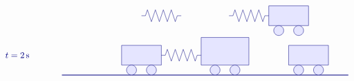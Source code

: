 \begin{solution}
\begin{itemize}
\begin{equation*}
\begin{tikzpicture}[scale=0.8, color=blue!50!black]
\begin{scope}[yshift=-2cm]
\begin{scope}[xshift=8.4cm]
            \draw[fill=blue!10] (2,0.5) rectangle (4,1.5);
            \draw[fill=blue!10] (2.5,0.25) circle (0.25);
            \draw[fill=blue!10] (3.5,0.25) circle (0.25);
          \end{scope}
          \begin{scope}[xshift=4cm]
            \draw (0,1) -- ++(0.2,0) -- ++(0.1,0.3)
            -- ++(0.2,-0.6) -- ++(0.2,0.6)
            -- ++(0.2,-0.6) -- ++(0.2,0.6)
            -- ++(0.2,-0.6) -- ++(0.2,0.6)
            -- ++(0.2,-0.6) -- ++(0.1,0.3)
            -- ++(0.2,0);
          \end{scope}
          \begin{scope}[xshift=8.4cm]
            \draw (0,1) -- ++(0.2,0) -- ++(0.1,0.3)
            -- ++(0.2,-0.6) -- ++(0.2,0.6)
            -- ++(0.2,-0.6) -- ++(0.2,0.6)
            -- ++(0.2,-0.6) -- ++(0.2,0.6)
            -- ++(0.2,-0.6) -- ++(0.1,0.3)
            -- ++(0.2,0);
          \end{scope}
        \end{scope}
        \begin{scope}[yshift=-4cm]
          \draw (-3,1) node[right] {$t=2\s$};
          \draw[thick] (0,0) -- (14.4,0);
          \begin{scope}[xshift=1cm]
            \draw[fill=blue!10] (2,0.5) rectangle (4,1.5);
            \draw[fill=blue!10] (2.5,0.25) circle (0.25);
            \draw[fill=blue!10] (3.5,0.25) circle (0.25);
          \end{scope}
          \begin{scope}[xshift=5.2cm]
            \draw[fill=blue!10] (1.8,0.5) rectangle (4.2,1.9);
            \draw[fill=blue!10] (2.5,0.25) circle (0.25);
            \draw[fill=blue!10] (3.5,0.25) circle (0.25);
          \end{scope}
          \begin{scope}[xshift=9.4cm]
            \draw[fill=blue!10] (2,0.5) rectangle (4,1.5);
            \draw[fill=blue!10] (2.5,0.25) circle (0.25);
            \draw[fill=blue!10] (3.5,0.25) circle (0.25);
          \end{scope}
          \begin{scope}[xshift=5cm]
            \draw (0,1) -- ++(0.2,0) -- ++(0.1,0.3)
            -- ++(0.2,-0.6) -- ++(0.2,0.6)
            -- ++(0.2,-0.6) -- ++(0.2,0.6)
            -- ++(0.2,-0.6) -- ++(0.2,0.6)
            -- ++(0.2,-0.6) -- ++(0.1,0.3)
            -- ++(0.2,0);
          \end{scope}
          \begin{scope}[xshift=9.4cm]

\end{scope}
\end{scope}
\end{tikzpicture}
\end{equation*}
\end{itemize}
\end{solution}
